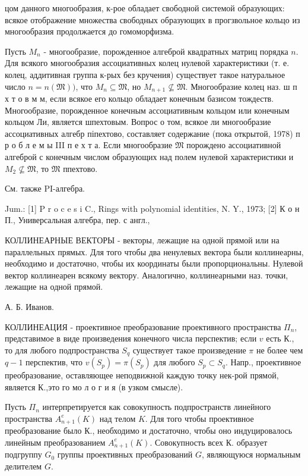 \documentclass[10pt]{article}
\begin{document}
цом данного многообразия, к-рое обладает свободной системой образующих: всякое отображение множества свободных образующих в прогзвольное кольцо из многообразия продолжается до гомоморфизма.



Пусть $M_{n}$ - многообразие, порожденное алгеброй квадратных матриц порядка $n$. Для всякого многообразия ассоциативных колец нулевой характеристики (т. е. колец, аддитивная группа к-рых без кручения) существует такое натуральное число $n=n(\mathfrak{M}))$, что $M_{n} \subseteq \mathfrak{M}$, но $M_{n+1} \nsubseteq \mathfrak{M}$. Многообразие колец наз. ш п х т о в м м, если всякое его кольцо обладает конечным базисом тождеств. Многообразие, порожденное конечным ассоциативным кольцом или конечным кольцом Ли, является шпехтовым. Вопрос о том, всякое ли многообразие ассоциативных алгебр піпехтово, составляет содержание (пока открытой, 1978) п р о б л е м ы III п е х т а. Если многообразие $\mathfrak{M}$ порождено ассоциативной алгеброй с конечным числом образующих над полем нулевой характеристики и $M_{2} \nsubseteq \mathfrak{M}$, то $\mathfrak{M}$ ппехтово.



См. также PI-алгебра.



Jum.: [1] P r o c e s i C., Rings with polynomial identities, N. Y., 1973; [2] К о н П., Универсальная алгебра, пер. с англ.,



КОЛЛИНЕАРНЫЕ ВЕКТОРЫ - векторы, лежащие на одной прямой или на параллельных прямых. Для того чтобы два ненулевых вектора были коллинеарны, необходимо и достаточно, чтобы их координаты были пропорциональны. Нулевой вектор коллинеарен всякому вектору. Аналогично, коллинеарными наз. точки, лежащие на одной прямой.



А. Б. Иванов.



КОЛЛИНЕАЦИЯ - проективное преобразование проективного пространства $\Pi_{n}$, представимое в виде произведения конечного числа перспектив; если $v$ есть К., то для любого подпространства $S_{q}$ существует такое произведение $\pi$ не более чем $q-1$ перспектив, что $v\left(S_{p}\right)=\pi\left(S_{p}\right)$ для любого $S_{p} \subset S_{q}$. Напр., проективное преобразование, оставляющее неподвижной каждую точку нек-рой прямой, является К.,это го мо л о г и я (в узком смысле).



Пусть $\Pi_{n}$ интерпретируется как совокупность подпространств линейного пространства $A_{n+1}^{e}(K)$ над телом $K$. Для того чтобы проективное преобразование было К., необходимо и достаточно, чтобы оно индуцировалось линейным преобразованием $A_{n+1}^{e}(K)$. Совокупность всех К. образует подгруппу $G_{0}$ группы проективных преобразований $G$, являющуюся нормальным делителем $G$.
\end{document}
